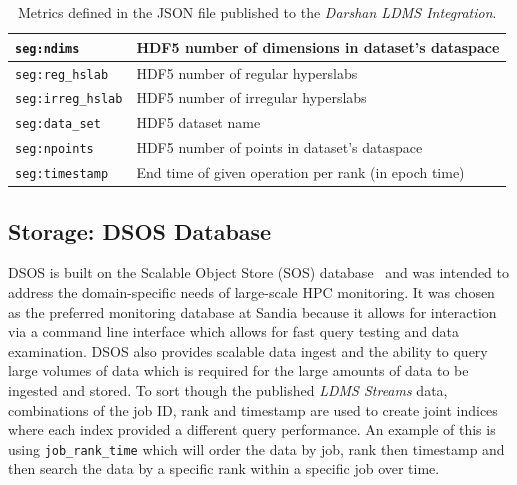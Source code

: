 \begin{table}[h]
{\begin{tabular}{|l|l|}
	\texttt{seg:ndims} & HDF5 number of dimensions in dataset's dataspace\\ \hline
	\texttt{seg:reg\_hslab} & HDF5 number of regular hyperslabs\\ \hline
        \texttt{seg:irreg\_hslab} & HDF5 number of irregular hyperslabs\\ \hline
	\texttt{seg:data\_set} & HDF5 dataset name\\ \hline
	\texttt{seg:npoints} & HDF5 number of points in dataset's dataspace\\ \hline
        \texttt{seg:timestamp} & End time of given operation per rank (in epoch time)\\ \hline          
	\end{tabular}}
	\caption{Metrics defined in the JSON file published to the \emph{Darshan LDMS Integration}.}
	\label{table:metrics}
      \end{table}

\subsection{Storage: DSOS Database}
DSOS is built on the Scalable Object Store (SOS) database~\cite{sosgithub} and was intended to address the domain-specific needs of large-scale HPC monitoring. It was chosen as the preferred monitoring database at Sandia because it allows for interaction via a command line interface which allows for fast query testing and data examination. DSOS also provides scalable data ingest and the ability to query large volumes of data which is required for the large amounts of data to be ingested and stored. %
To sort though the published \emph{LDMS Streams} data, combinations of the job ID, rank and timestamp are used to create joint indices where each index provided a different query performance. An example of this is using \texttt{job\_rank\_time} which will order the data by job, rank then timestamp and then search the data by a specific rank within a specific job over time.

